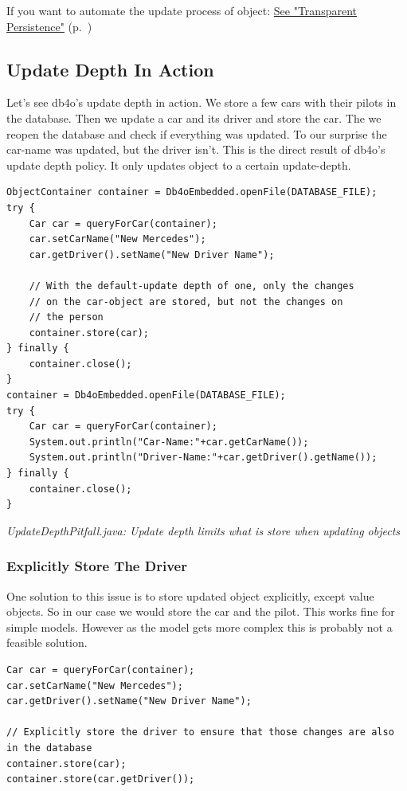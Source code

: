 If you want to automate the update process of object: \hyperref[ref:basics-update-concept-transparent-persistence]{See "Transparent Persistence"} (p.~\pageref{ref:basics-update-concept-transparent-persistence})

\subsection{Update Depth In Action}
\label{ref:basics-update-concept-update-depth-in-action}

Let's see db4o's update depth in action. We store a few cars with their pilots in the database. Then we update a car and its driver and store the car. The we reopen the database and check if everything was updated. To our surprise the car-name was updated, but the driver isn't. This is the direct result of db4o's update depth policy. It only updates object to a certain update-depth.

\begin{lstlisting}
ObjectContainer container = Db4oEmbedded.openFile(DATABASE_FILE);
try {
    Car car = queryForCar(container);
    car.setCarName("New Mercedes");
    car.getDriver().setName("New Driver Name");

    // With the default-update depth of one, only the changes
    // on the car-object are stored, but not the changes on
    // the person
    container.store(car);
} finally {
    container.close();
}
container = Db4oEmbedded.openFile(DATABASE_FILE);
try {
    Car car = queryForCar(container);
    System.out.println("Car-Name:"+car.getCarName());
    System.out.println("Driver-Name:"+car.getDriver().getName());
} finally {
    container.close();
}
\end{lstlisting}

{\small\itshape UpdateDepthPitfall.java: Update depth limits what is store when updating objects\par}
\medskip

\subsubsection*{Explicitly Store The Driver}

One solution to this issue is to store updated object explicitly, except value objects. So in our case we would store the car and the pilot. This works fine for simple models. However as the model gets more complex this is probably not a feasible solution.

\begin{lstlisting}
Car car = queryForCar(container);
car.setCarName("New Mercedes");
car.getDriver().setName("New Driver Name");

// Explicitly store the driver to ensure that those changes are also in the database
container.store(car);
container.store(car.getDriver());
\end{lstlisting}


